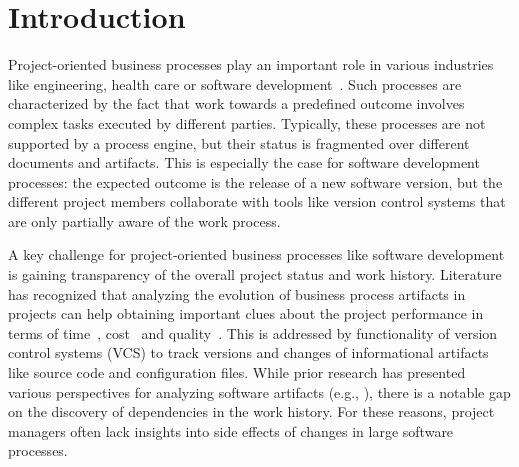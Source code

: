 \section{Introduction}

Project-oriented business processes play an important role in various industries like engineering, health care or software development~\citep{DBLP:conf/bpm/BalaCMRP15}. Such processes are characterized by the fact that work towards a predefined outcome involves complex tasks executed by different parties. Typically, these processes are not supported by a process engine, but their status is fragmented over different documents and artifacts.
This is especially the case for software development processes: the expected outcome is the release of a new software version, but the different project members collaborate with tools like version control systems that are only partially aware of the work process. %

A key challenge for project-oriented business processes like software development is gaining transparency of the overall project status and work history. Literature has recognized that analyzing the evolution of business process artifacts in projects can help obtaining important clues about the project performance in terms of time~\citep{Beheshti2016}, cost~\citep{DBLP:journals/cg/VoineaT07} and quality~\citep{Lindberg2016}. This is addressed by functionality of version control systems (VCS) to track versions and changes of informational artifacts like source code and configuration files. While prior research has presented various perspectives for analyzing software artifacts (e.g.,
\cite{Bani2016,Robles:2014:EDE:2597073.2597107,Mittal2014,Weicheng2013}), there is a notable gap on the discovery of dependencies in the work history. For these reasons, project managers often lack insights into side effects of changes in large software processes.

